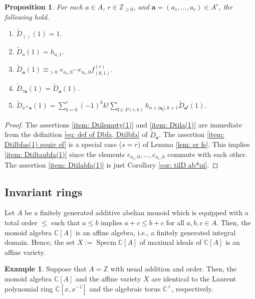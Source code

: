 \documentclass[12pt,a4paper]{amsart}
\newtheorem{prop}[thm]{Proposition}
\theoremstyle{definition}
\newtheorem{ex}[thm]{Example}
\numberwithin{equation}{subsection}
\begin{document}
\begin{prop}\label{prop: properties of Dtilbfa(1)}
  For each $a \in A$, $r \in \mathbb{Z}_{\geq 0}$, and $\mathbf{a} = (a_1,\dots,a_r) \in A^r$, the following hold.
  \begin{enumerate}
    \item\label{item: Dtilempty(1)} $\tilde{D}_{()}(1) = 1.$
    \item\label{item: Dtila(1)} $\tilde{D}_a(1) = h_{a,1}$.
    \item\label{item: Dtilbfas(1) equiv ef} $\tilde{D}_\mathbf{a}(1) \equiv_{>0} e_{a_1,0} \cdots e_{a_r,0} f_{(0,1)}^{(r)}$.
    \item\label{item: Dtiltaubfa(1)} $\tilde{D}_{\tau \mathbf{a}}(1) = \tilde{D}_\mathbf{a}(1)$.
    \item\label{item: Dtilabfa(1)} $\tilde{D}_{a*\mathbf{a}}(1) = \sum_{k=0}^r (-1)^k k! \sum_{\mathbf{l} \in P(r,k)} h_{a+|\mathbf{a}_\mathbf{l}|,k+1} \tilde{D}_{\mathbf{a}^\mathbf{l}}(1)$.
  \end{enumerate}
\end{prop}
\begin{proof}
  The assertions \eqref{item: Dtilempty(1)} and \eqref{item: Dtila(1)} are immediate from the definition \eqref{eq: def of Dbfa, Dtilbfa} of $\tilde{D}_\mathbf{a}$.
  The assertion \eqref{item: Dtilbfas(1) equiv ef} is a special case ($s = r$) of Lemma \ref{lem: er fs}.
  This implies \eqref{item: Dtiltaubfa(1)} since the elements $e_{a_1,0},\dots,e_{a_r,0}$ commute with each other.
  The assertion \eqref{item: Dtilabfa(1)} is just Corollary \ref{cor: tilD ab*pi}.
\end{proof}


\subsection{Invariant rings}
Let $A$ be a finitely generated additive abelian monoid which is equipped with a total order $\leq$ such that $a \leq b$ implies $a+c \leq b+c$ for all $a,b,c \in A$.
Then, the monoid algebra $\mathbb{C}[A]$ is an affine algebra, i.e., a finitely generated integral domain.
Hence, the set $X := \operatorname{Specm} \mathbb{C}[A]$ of maximal ideals of $\mathbb{C}[A]$ is an affine variety.

\begin{ex}
  Suppose that $A = \mathbb{Z}$ with usual addition and order.
  Then, the monoid algebra $\mathbb{C}[A]$ and the affine variety $X$ are identical to the Laurent polynomial ring $\mathbb{C}[x,x^{-1}]$ and the algebraic torus $\mathbb{C}^\times$, respectively.
\end{ex}
\end{document}
